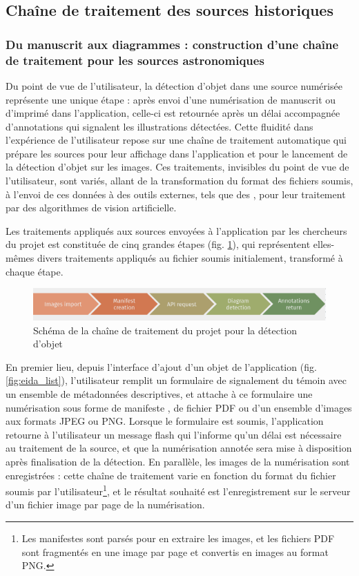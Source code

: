 
\subsection{Chaîne de traitement des sources historiques}
    \subsubsection{Du manuscrit aux diagrammes : construction d'une chaîne de traitement pour les sources astronomiques}
	Du point de vue de l'utilisateur, la détection d'objet dans une source numérisée représente une unique étape : après envoi d'une numérisation de manuscrit ou d'imprimé dans l'application, celle-ci est retournée après un délai accompagnée d'annotations qui signalent les illustrations détectées. Cette fluidité dans l'expérience de l'utilisateur repose sur une chaîne de traitement automatique qui prépare les sources pour leur affichage dans l'application et pour le lancement de la détection d'objet sur les images. Ces traitements, invisibles du point de vue de l'utilisateur, sont variés, allant de la transformation du format des fichiers soumis, à l'envoi de ces données à des outils externes, tels que des \api, pour leur traitement par des algorithmes de vision artificielle.
	
	Les traitements appliqués aux sources envoyées à l'application par les chercheurs du projet \eida est constituée de cinq grandes étapes (fig. \ref{fig:detection_workflow}), qui représentent elles-mêmes divers traitements appliqués au fichier soumis initialement, transformé à chaque étape. 
	
	\begin{figure}[h]
		\centering
		\includegraphics[width=16cm]{images/detection_workflow.png}
		\caption{Schéma de la chaîne de traitement du projet \eida pour la détection d'objet}
		\label{fig:detection_workflow}
	\end{figure}

	En premier lieu, depuis l'interface d'ajout d'un objet de l'application \eida (fig. \ref{fig:eida_list}), l'utilisateur remplit un formulaire de signalement du témoin avec un ensemble de métadonnées descriptives, et attache à ce formulaire une numérisation sous forme de manifeste \iiif, de fichier PDF ou d'un ensemble d'images aux formats JPEG ou PNG. Lorsque le formulaire est soumis, l'application retourne à l'utilisateur un message flash qui l'informe qu'un délai est nécessaire au traitement de la source, et que la numérisation annotée sera mise à disposition après finalisation de la détection. En parallèle, les images de la numérisation sont enregistrées : cette chaîne de traitement varie en fonction du format du fichier soumis par l'utilisateur\footnote{Les manifestes \iiif sont parsés pour en extraire les images, et les fichiers PDF sont fragmentés en une image par page et convertis en images au format PNG.}, et le résultat souhaité est l'enregistrement sur le serveur d'un fichier image par page de la numérisation.
	
